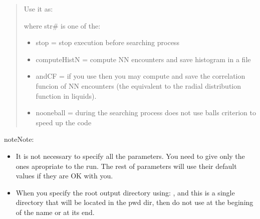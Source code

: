 \documentclass[letterpaper,10pt,english]{sphinxmanual}
\begin{document}
\begin{quote}
\begin{description}
\sphinxAtStartPar
Use it as:

\begin{sphinxVerbatim}[commandchars=\\\{\}]
  
\end{sphinxVerbatim}

\sphinxAtStartPar
where str\# is one of the:
\begin{itemize}
\item {} 
\sphinxAtStartPar
stop = stop execution before searching process

\item {} 
\sphinxAtStartPar
compute\sphinxhyphen{}HistN = compute NN encounters and save histogram in a file

\item {} 
\sphinxAtStartPar
and\sphinxhyphen{}CF = if you use  then you may compute and save the correlation funcion of NN encounters (the equivalent to the radial distribution function in liquids).

\item {} 
\sphinxAtStartPar
no\sphinxhyphen{}one\sphinxhyphen{}ball = during the searching process does not use balls criterion to speed up the code

\end{itemize}

\end{description}\end{quote}

\begin{sphinxadmonition}{note}{Note:}\begin{itemize}
\item {} 
\sphinxAtStartPar
It is not necessary to specify all the parameters. You need to give only the ones apropriate to the run. The rest of parameters will use their default values if they are OK with you.

\item {} 
\sphinxAtStartPar
When you specify the root output directory using: , and this is a single directory that will be located in the pwd dir, then do not use  at the begining of the name or \sphinxcode{\sphinxupquote{/}} at its end.

\end{itemize}
\end{sphinxadmonition}
\end{document}

